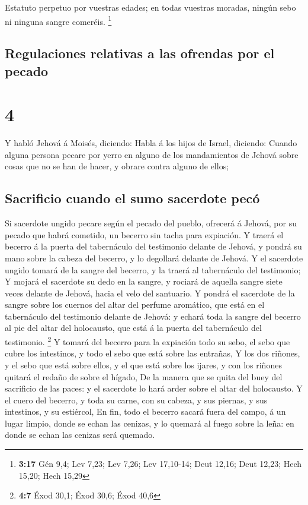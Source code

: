  Estatuto perpetuo por vuestras edades; en todas vuestras
moradas, ningún sebo ni ninguna sangre comeréis. \footnote{\textbf{3:17}
  Gén 9,4; Lev 7,23; Lev 7,26; Lev 17,10-14; Deut 12,16; Deut 12,23;
  Hech 15,20; Hech 15,29}

\hypertarget{regulaciones-relativas-a-las-ofrendas-por-el-pecado}{%
\subsection{Regulaciones relativas a las ofrendas por el
pecado}\label{regulaciones-relativas-a-las-ofrendas-por-el-pecado}}

\hypertarget{section-3}{%
\section{4}\label{section-3}}

 Y habló Jehová á Moisés, diciendo:  Habla á los
hijos de Israel, diciendo: Cuando alguna persona pecare por yerro en
alguno de los mandamientos de Jehová sobre cosas que no se han de hacer,
y obrare contra alguno de ellos;

\hypertarget{sacrificio-cuando-el-sumo-sacerdote-pecuxf3}{%
\subsection{Sacrificio cuando el sumo sacerdote
pecó}\label{sacrificio-cuando-el-sumo-sacerdote-pecuxf3}}

 Si sacerdote ungido pecare según el pecado del pueblo,
ofrecerá á Jehová, por su pecado que habrá cometido, un becerro sin
tacha para expiación.  Y traerá el becerro á la puerta del
tabernáculo del testimonio delante de Jehová, y pondrá su mano sobre la
cabeza del becerro, y lo degollará delante de Jehová.  Y el
sacerdote ungido tomará de la sangre del becerro, y la traerá al
tabernáculo del testimonio;  Y mojará el sacerdote su dedo
en la sangre, y rociará de aquella sangre siete veces delante de Jehová,
hacia el velo del santuario.  Y pondrá el sacerdote de la
sangre sobre los cuernos del altar del perfume aromático, que está en el
tabernáculo del testimonio delante de Jehová: y echará toda la sangre
del becerro al pie del altar del holocausto, que está á la puerta del
tabernáculo del testimonio. \footnote{\textbf{4:7} Éxod 30,1; Éxod 30,6;
  Éxod 40,6}  Y tomará del becerro para la expiación todo su
sebo, el sebo que cubre los intestinos, y todo el sebo que está sobre
las entrañas,  Y los dos riñones, y el sebo que está sobre
ellos, y el que está sobre los ijares, y con los riñones quitará el
redaño de sobre el hígado,  De la manera que se quita del
buey del sacrificio de las paces: y el sacerdote lo hará arder sobre el
altar del holocausto.  Y el cuero del becerro, y toda su
carne, con su cabeza, y sus piernas, y sus intestinos, y su estiércol,
 En fin, todo el becerro sacará fuera del campo, á un lugar
limpio, donde se echan las cenizas, y lo quemará al fuego sobre la leña:
en donde se echan las cenizas será quemado.

